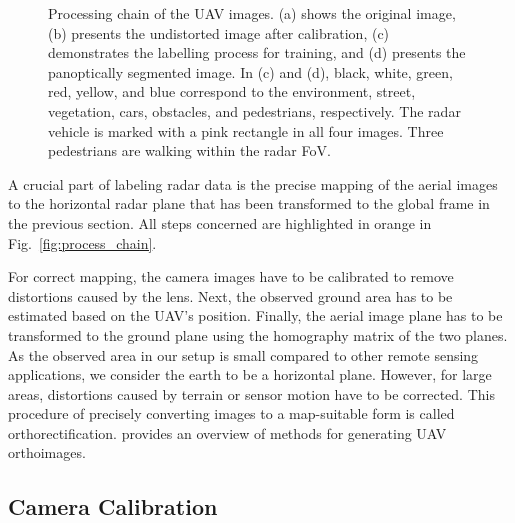 \documentclass[conference]{IEEEtran}
\begin{document}
\begin{figure*}[tb]
    \centering
   \hspace{0.5cm}
  \hspace{0.5cm}
  \hspace{0.5cm}
     \vspace{-0.2cm}   
    \caption{Processing chain of the UAV images. (a) shows the original 
 image, (b) presents the undistorted image after calibration, (c) demonstrates the labelling process for training, and (d) presents the panoptically segmented image. In (c) and (d), black, white, green, red, yellow, and blue correspond to the environment, street, vegetation, cars, obstacles, and pedestrians, respectively. The radar vehicle is marked with a pink rectangle in all four images. Three pedestrians are walking within the radar FoV.}
    \label{fig:img_chain}
\end{figure*}

A crucial part of labeling radar data is the precise mapping of the aerial images to the horizontal radar plane that has been transformed to the global frame in the previous section.
All steps concerned are highlighted in orange in Fig.~\ref{fig:process_chain}.

For correct mapping, the camera images have to be calibrated to remove distortions caused by the lens.
Next, the observed ground area has to be estimated based on the UAV's position.
Finally, the aerial image plane has to be transformed to the ground plane using the homography matrix of the two planes.
As the observed area in our setup is small compared to other remote sensing applications, we consider the earth to be a horizontal plane.
However, for large areas, distortions caused by terrain or sensor motion have to be corrected.
This procedure of precisely converting images to a map-suitable form is called orthorectification.
\cite{b10} provides an overview of methods for generating UAV orthoimages.

%
%
\subsection{Camera Calibration}
\end{document}
